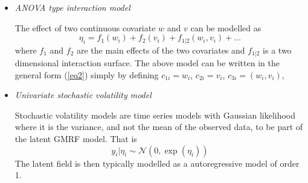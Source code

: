 \documentclass[a4paper,11pt]{article}
\begin{document}
\begin{itemize}
\item {\it ANOVA type interaction model}

    The effect of two continuous covariate $w$ and $v$ can be modelled
    as
    \[
    \eta_i=f_1(w_i)+f_2(v_i)+f_{1|2}(w_i,v_i)+\dots
    \]
    where $f_1$ and $f_2$ are the main effects of the two covariates
    and $f_{1|2}$ is a two dimensional interaction surface. The above
    model can be written in the general form (\ref{eq2}) simply by
    defining $c_{1i}=w_i$, $c_{2i}=v_i$, $c_{3i}=(w_i,v_i)$,

\item {\it Univariate stochastic volatility model}

    Stochastic volatility models are time series models with Gaussian
    likelihood where it is the variance, and not the mean of the
    observed data, to be part of the latent GMRF model. That is
    \[
    y_i|\eta_i\sim\mathcal{N}(0,\exp(\eta_i))
    \]
    The latent field is then typically modelled as a autoregressive
    model of order 1.
\end{itemize}

\small \newpage
\end{document}

